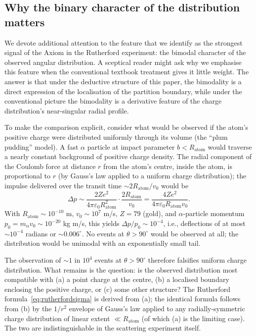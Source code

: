 \documentclass[11pt,twocolumn,a4paper]{article}
\theoremstyle{axiomstyle}
\theoremstyle{conseqstyle}
\theoremstyle{definition}
\theoremstyle{remark}
\begin{document}
\subsection{Why the binary character of the distribution matters}

We devote additional attention to the feature that we identify as the strongest signal of the Axiom in the Rutherford experiment: the bimodal character of the observed angular distribution. A sceptical reader might ask why we emphasise this feature when the conventional textbook treatment gives it little weight. The answer is that under the deductive structure of this paper, the bimodality is a direct expression of the localisation of the partition boundary, while under the conventional picture the bimodality is a derivative feature of the charge distribution's near-singular radial profile.

To make the comparison explicit, consider what would be observed if the atom's positive charge were distributed uniformly through its volume (the ``plum pudding'' model). A fast $\alpha$ particle at impact parameter $b<R_{\text{atom}}$ would traverse a nearly constant background of positive charge density. The radial component of the Coulomb force at distance $r$ from the atom's centre, inside the atom, is proportional to $r$ (by Gauss's law applied to a uniform charge distribution); the impulse delivered over the transit time $\sim 2R_{\text{atom}}/v_{0}$ would be
\begin{equation*}
\Delta p\sim\frac{2Ze^{2}}{4\pi\varepsilon_{0}R_{\text{atom}}^{2}}\cdot\frac{2R_{\text{atom}}}{v_{0}}=\frac{4Ze^{2}}{4\pi\varepsilon_{0}R_{\text{atom}}v_{0}}.
\end{equation*}
With $R_{\text{atom}}\sim 10^{-10}$ m, $v_{0}\sim 10^{7}$ m/s, $Z=79$ (gold), and $\alpha$-particle momentum $p_{0}=m_{\alpha}v_{0}\sim 10^{-20}$ kg m/s, this yields $\Delta p/p_{0}\sim 10^{-4}$, i.e., deflections of at most $\sim 10^{-4}$ radians or $\sim 0.006^{\circ}$. No events at $\theta>90^{\circ}$ would be observed at all; the distribution would be unimodal with an exponentially small tail.

The observation of $\sim 1$ in $10^{4}$ events at $\theta>90^{\circ}$ therefore falsifies uniform charge distribution. What remains is the question: is the observed distribution most compatible with (a) a point charge at the centre, (b) a localised boundary enclosing the positive charge, or (c) some other structure? The Rutherford formula~\eqref{eq:rutherfordsigma} is derived from (a); the identical formula follows from (b) by the $1/r^{2}$ envelope of Gauss's law applied to any radially-symmetric charge distribution of linear extent $\ll R_{\text{atom}}$ (of which (a) is the limiting case). The two are indistinguishable in the scattering experiment itself.
\end{document}
